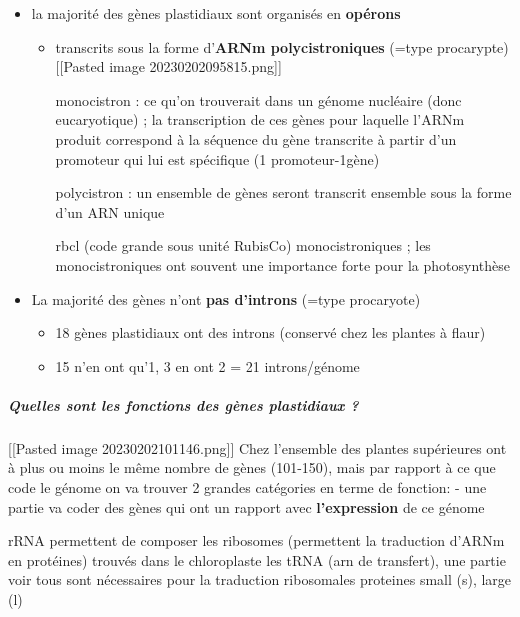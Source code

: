 \documentclass[
]{article}
\providecommand{\tightlist}{%
  \setlength{\itemsep}{0pt}\setlength{\parskip}{0pt}}
\begin{document}
\begin{itemize}
\tightlist
\item
  la majorité des gènes plastidiaux sont organisés en \textbf{opérons}

  \begin{itemize}
  \tightlist
  \item
    transcrits sous la forme d’\textbf{ARNm polycistroniques} (=type
    procarypte) {[}{[}Pasted image 20230202095815.png{]}{]}

    monocistron : ce qu’on trouverait dans un génome nucléaire (donc
    eucaryotique) ; la transcription de ces gènes pour laquelle l’ARNm
    produit correspond à la séquence du gène transcrite à partir d’un
    promoteur qui lui est spécifique (1 promoteur-1gène)

    polycistron : un ensemble de gènes seront transcrit ensemble sous la
    forme d’un ARN unique

    rbcl (code grande sous unité RubisCo) monocistroniques ; les
    monocistroniques ont souvent une importance forte pour la
    photosynthèse
  \end{itemize}
\item
  La majorité des gènes n’ont \textbf{pas d’introns} (=type procaryote)

  \begin{itemize}
  \tightlist
  \item
    18 gènes plastidiaux ont des introns (conservé chez les plantes à
    flaur)
  \item
    15 n’en ont qu’1, 3 en ont 2 = 21 introns/génome
  \end{itemize}
\end{itemize}

\hypertarget{quelles-sont-les-fonctions-des-guxe8nes-plastidiaux}{%
\subparagraph{Quelles sont les fonctions des gènes plastidiaux
?}\label{quelles-sont-les-fonctions-des-guxe8nes-plastidiaux}}

{[}{[}Pasted image 20230202101146.png{]}{]} Chez l’ensemble des plantes
supérieures ont à plus ou moins le même nombre de gènes (101-150), mais
par rapport à ce que code le génome on va trouver 2 grandes catégories
en terme de fonction: - une partie va coder des gènes qui ont un rapport
avec \textbf{l’expression} de ce génome

rRNA permettent de composer les ribosomes (permettent la traduction
d’ARNm en protéines) trouvés dans le chloroplaste les tRNA (arn de
transfert), une partie voir tous sont nécessaires pour la traduction
ribosomales proteines small (s), large (l)
\end{document}
